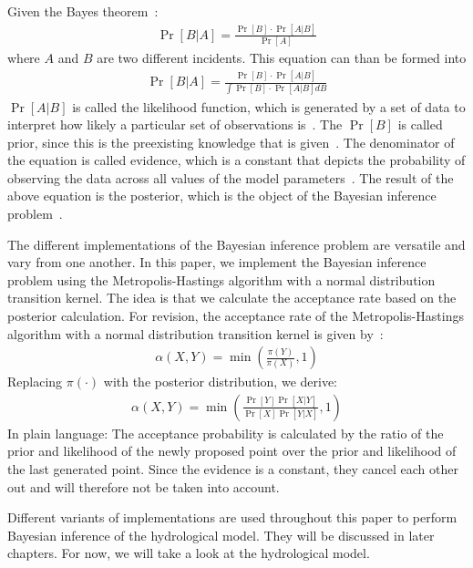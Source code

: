 Given the Bayes theorem~\cite{SatzBayes}:
\begin{align}
    \Pr[B|A] = \frac{\Pr[B]\cdot\Pr[A|B]}{\Pr[A]}
\end{align}
where $A$ and $B$ are two different incidents. This equation can than be formed into
\begin{align}
    \Pr[B|A] = \frac{\Pr[B]\cdot\Pr[A|B]}{\int\Pr[B]\cdot\Pr[A|B]dB}
\end{align}
$\Pr[A|B]$ is called the likelihood function, which is generated by a set of data to interpret how likely a particular set of observations is~\cite{likelihood_idea}. The $\Pr[B]$ is called prior, since this is the preexisting knowledge that is given~\cite{prior}. The denominator of the equation is called evidence, which is a constant that depicts the probability of observing the data across all values of the model parameters~\cite{mcmc_practice}. The result of the above equation is the posterior, which is the object of the Bayesian inference problem~\cite{mcmc_practice}.

The different implementations of the Bayesian inference problem are versatile and vary from one another. In this paper, we implement the Bayesian inference problem using the Metropolis-Hastings algorithm with a normal distribution transition kernel. The idea is that we calculate the acceptance rate based on the posterior calculation. For revision, the acceptance rate of the Metropolis-Hastings algorithm with a normal distribution transition kernel is given by~\cite{mcmc_practice}:
\begin{align}
    \alpha(X, Y) = \min (\frac{\pi(Y)}{\pi(X)}, 1)
\end{align}
Replacing $\pi(\cdot)$ with the posterior distribution, we derive:
\begin{align}
    \alpha(X, Y) = \min (\frac{\Pr[Y]\Pr[X|Y]}{\Pr[X]\Pr[Y|X]}, 1)
\end{align}
In plain language: The acceptance probability is calculated by the ratio of the prior and likelihood of the newly proposed point over the prior and likelihood of the last generated point. Since the evidence is a constant, they cancel each other out and will therefore not be taken into account.

Different variants of implementations are used throughout this paper to perform Bayesian inference of the hydrological model. They will be discussed in later chapters. For now, we will take a look at the hydrological model.





